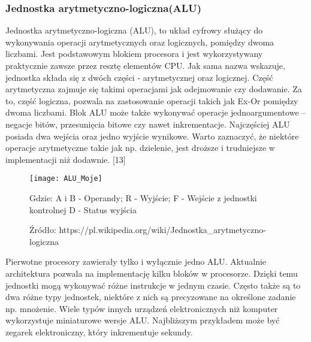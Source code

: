 \documentclass[12pt, a4paper, onside, polish]{article}				%
\begin{document}
\subsubsection{Jednostka arytmetyczno-logiczna(ALU)}
\hspace{\parindent}
	Jednostka arytmetyczno-logiczna (ALU), to układ cyfrowy służący do wykonywania operacji arytmetycznych oraz logicznych, pomiędzy dwoma liczbami. Jest podstawowym blokiem procesora i jest wykorzystywany praktycznie zawsze przez resztę elementów CPU. Jak sama nazwa wskazuje, jednostka składa się z dwóch części - arytmetycznej oraz logicznej. Część arytmetyczna zajmuje się takimi operacjami jak odejmowanie czy dodawanie. Za to, część logiczna, pozwala na zastosowanie operacji takich jak Ex-Or pomiędzy dwoma liczbami. Blok ALU może także wykonywać operacje jednoargumentowe – negacje bitów, przesunięcia bitowe czy nawet inkrementacje. Najczęściej ALU posiada dwa wejścia oraz jedno wyjście wynikowe. Warto zaznaczyć, że niektóre operacje arytmetyczne takie jak np. dzielenie, jest droższe i trudniejsze w implementacji niż dodawnie. [13]

\begin{figure}[H]
{\centering \texttt{[image: ALU\_Moje]} \caption{Typowy symbol - ALU} \caption*{Źródło: https://pl.wikipedia.org/wiki/Jednostka_arytmetyczno-logiczna}}\vspace{5mm}
Gdzie:\newline
A i B - Operandy;\newline
R - Wyjście;\newline
F - Wejście z jednostki kontrolnej\newline
D - Status wyjścia\newline
\end{figure}

	Pierwotne procesory zawierały tylko i wyłącznie jedno ALU. Aktualnie architektura pozwala na implementację kilku bloków w procesorze. Dzięki temu jednostki mogą wykonywać różne instrukcje w jednym czasie. Często także są to dwa różne typy jednostek, niektóre z nich są precyzowane na określone zadanie np. mnożenie. Wiele typów innych urządzeń elektronicznych niż komputer wykorzystuje miniaturowe wersje ALU. Najbliższym przykładem może być zegarek elektroniczny, który inkrementuje sekundy.  
\end{document}
